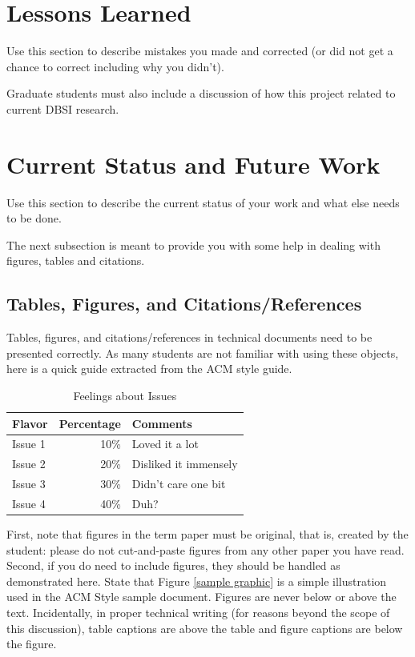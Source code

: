 \documentclass{sig-alternate}
\begin{document}
\section{Lessons Learned}
\label{mistakes}

Use this section to describe mistakes you made and corrected (or did
not get a chance to correct including why you didn't).

Graduate students must also include a discussion of how this project
related to current DBSI research.

\section{Current Status and Future Work}
\label{current status}

Use this section to describe the current status of your work
and what else needs to be done.

The next subsection is meant to provide you with some help
in dealing with figures, tables and citations.

\subsection{Tables, Figures, and Citations/References}

Tables, figures, and citations/references in technical
documents need to be presented correctly. As many students
are not familiar with using these objects, here is a quick
guide extracted from the ACM style guide.

\begin{table}
\centering
\caption{Feelings about Issues}
\begin{tabular}{|l|r|l|} \hline
Flavor&Percentage&Comments\\ \hline
Issue 1 &  10\% & Loved it a lot\\ \hline
Issue 2 &  20\% & Disliked it immensely\\ \hline
Issue 3 &  30\% & Didn't care one bit\\ \hline
Issue 4 &  40\% & Duh?\\ \hline
\end{tabular}
\end{table}


First, note that figures in the term paper must be original,
that is, created by the student: please do not cut-and-paste
figures from any other paper you have read. Second, if you
do need to include figures, they should be handled as
demonstrated here. State that Figure \ref{sample graphic} is
a simple illustration used in the ACM Style sample
document. Figures are never below or above the
text. Incidentally, in proper technical writing (for reasons
beyond the scope of this discussion), table captions are
above the table and figure captions are below the figure.
\end{document}
